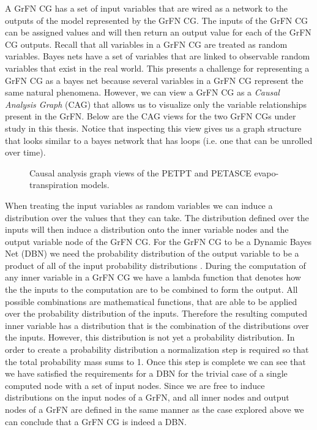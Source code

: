 A GrFN CG has a set of input variables that are wired as a network to the outputs of the model represented by the GrFN CG.
The inputs of the GrFN CG can be assigned values and will then return an output value for each of the GrFN CG outputs.
Recall that all variables in a GrFN CG are treated as random variables.
Bayes nets have a set of variables that are linked to observable random variables that exist in the real world.
This presents a challenge for representing a GrFN CG as a bayes net because several variables in a GrFN CG represent the same natural phenomena.
However, we can view a GrFN CG as a \emph{Causal Analysis Graph} (CAG) that allows us to visualize only the variable relationships present in the GrFN.
Below are the CAG views for the two GrFN CGs under study in this thesis. Notice that inspecting this view gives us a graph structure that looks similar to a bayes network that has loops (i.e. one that can be unrolled over time).

\FloatBarrier
\begin{figure}[!tbp]
  \centering

  \caption[GrFN Causal Analysis Graph Examples]{Causal analysis graph views of the PETPT and PETASCE evapo-transpiration models.}
\end{figure}
\FloatBarrier

When treating the input variables as random variables we can induce a distribution over the values that they can take.
The distribution defined over the inputs will then induce a distribution onto the inner variable nodes and the output variable node of the GrFN CG.
For the GrFN CG to be a Dynamic Bayes Net (DBN) we need the probability distribution of the output variable to be a product of all of the input probability distributions \citep{pearl2009causality}.
During the computation of any inner variable in a GrFN CG we have a lambda function that denotes how the the inputs to the computation are to be combined to form the output.
All possible combinations are mathematical functions, that are able to be applied over the probability distribution of the inputs.
Therefore the resulting computed inner variable has a distribution that is the combination of the distributions over the inputs.
However, this distribution is not yet a probability distribution.
In order to create a probability distribution a normalization step is required so that the total probability mass sums to 1.
Once this step is complete we can see that we have satisfied the requirements for a DBN for the trivial case of a single computed node with a set of input nodes.
Since we are free to induce distributions on the input nodes of a GrFN, and all inner nodes and output nodes of a GrFN are defined in the same manner as the case explored above we can conclude that a GrFN CG is indeed a DBN.

